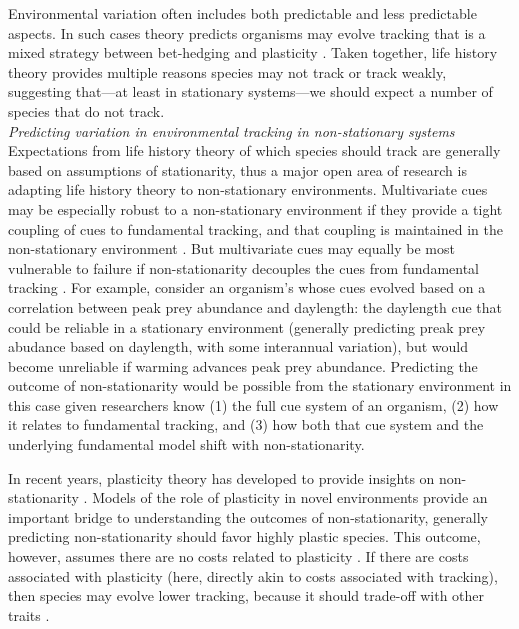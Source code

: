\documentclass[11pt,letterpaper]{article}
\newcommand{\R}[1]{\label{#1}\linelabel{#1}}
\begin{document}
Environmental variation often includes both predictable and less predictable aspects. In such cases theory predicts organisms may evolve tracking that is a mixed strategy between bet-hedging and plasticity \citep{wong2005}. Taken together, life history theory provides multiple reasons species may not track or track weakly, suggesting that---at least in stationary systems---we should expect a number of species that do not track.\R{bhE} \\


\emph{Predicting variation in environmental tracking in non-stationary systems}\\
Expectations from life history theory of which species should track are generally based on assumptions of stationarity, thus a major open area of research is adapting life history theory to non-stationary environments. Multivariate cues may be especially robust to a non-stationary environment if they provide a tight coupling of cues to fundamental tracking, and that coupling is maintained in the non-stationary environment \citep{dore2018}. But multivariate cues may equally be most vulnerable to failure if non-stationarity decouples the cues from fundamental tracking \citep{bonamour2019}. \R{r3birdsS}For example, consider an organism's whose cues evolved based on a correlation between peak prey abundance and daylength: the daylength cue that could be reliable in a stationary environment (generally predicting preak prey abudance based on daylength, with some interannual variation), but would become unreliable if warming advances peak prey abundance. Predicting the outcome of non-stationarity would be possible from the stationary environment in this case given researchers know (1) the full cue system of an organism, (2) how it relates to fundamental tracking, and (3) how both that cue system and the underlying fundamental model shift with non-stationarity.\R{r3birdsE}

In recent years, plasticity theory has developed to provide insights on non-stationarity \citep[or `sustained environmental change,' see][]{chevin2010}. Models of the role of plasticity in novel environments provide an important bridge to understanding the outcomes of non-stationarity, generally predicting non-stationarity should favor highly plastic species. This outcome, however, assumes there are no costs related to plasticity \citep{Ghalambor2007,tufto2015}. If there are costs associated with plasticity (here, directly akin to costs associated with tracking), then species may evolve lower tracking, because it should trade-off with other traits \citep{auld2010}. 
\end{document}
